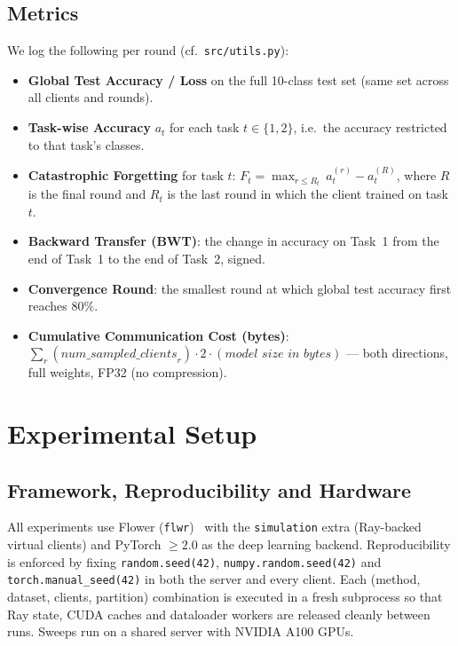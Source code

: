 \documentclass[journal]{IEEEtran}
\begin{document}
\subsection{Metrics}
\label{ssec:metrics}

We log the following per round (cf.\ \texttt{src/utils.py}):

\begin{itemize}
    \item \textbf{Global Test Accuracy / Loss} on the full 10-class
        test set (same set across all clients and rounds).
    \item \textbf{Task-wise Accuracy} $a_t$ for each task $t\!\in\!\{1,2\}$,
        i.e.\ the accuracy restricted to that task's classes.
    \item \textbf{Catastrophic Forgetting} for task $t$:
        $F_t = \max_{r\le R_t}\,a_t^{(r)} - a_t^{(R)}$,
        where $R$ is the final round and $R_t$ is the last round in
        which the client trained on task $t$.
    \item \textbf{Backward Transfer (BWT)}: the change in accuracy on
        Task~1 from the end of Task~1 to the end of Task~2, signed.
    \item \textbf{Convergence Round}: the smallest round at which
        global test accuracy first reaches $80\%$.
    \item \textbf{Cumulative Communication Cost (bytes)}:
        $\sum_r (\textit{num\_sampled\_clients}_r) \cdot 2 \cdot
        (\textit{model size in bytes})$ --- both directions, full
        weights, FP32 (no compression).
\end{itemize}

\section{Experimental Setup}
\label{sec:setup}

\subsection{Framework, Reproducibility and Hardware}

All experiments use Flower (\texttt{flwr})~\cite{flower} with the
\texttt{simulation} extra (Ray-backed virtual clients) and PyTorch
$\geq 2.0$ as the deep learning backend. Reproducibility is enforced
by fixing \texttt{random.seed(42)},
\texttt{numpy.random.seed(42)} and \texttt{torch.manual\_seed(42)} in
both the server and every client. Each (method, dataset, clients,
partition) combination is executed in a fresh subprocess so that Ray
state, CUDA caches and dataloader workers are released cleanly between
runs. Sweeps run on a shared server with NVIDIA A100 GPUs.
\end{document}
